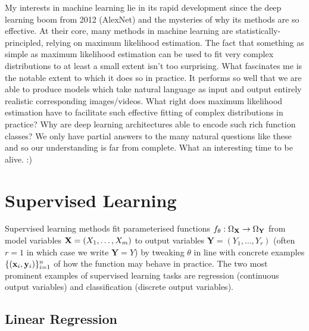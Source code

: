 \documentclass[11pt]{article}
\begin{document}
My interests in machine learning lie in its rapid development since the deep learning boom from 2012 (AlexNet) and the mysteries of why its methods are so effective. At their core, many methods in machine learning are statistically-principled, relying on maximum likelihood estimation. The fact that something as simple as maximum likelihood estimation can be used to fit very complex distributions to at least a small extent isn't too surprising. What fascinates me is the notable extent to which it does so in practice. It performs so well that we are able to produce models which take natural language as input and output entirely realistic corresponding images/videos. What right does maximum likelihood estimation have to facilitate such effective fitting of complex distributions in practice? Why are deep learning architectures able to encode such rich function classes? We only have partial answers to the many natural questions like these and so our understanding is far from complete. What an interesting time to be alive. :)

\section{Supervised Learning}
Supervised learning methods fit parameterised functions $f_{\theta}:\Omega_{\mathbf{X}}\to\Omega_{\mathbf{Y}}$ from model variables $\mathbf{X}=(X_1,\dots,X_m)$ to output variables $\mathbf{Y}=(Y_1,\dots,Y_r)$ (often $r=1$ in which case we write $\mathbf{Y}=Y$) by tweaking $\theta$ in line with concrete examples $\{(\mathbf{x}_i,\mathbf{y}_i)\}_{i=1}^n$ of how the function may behave in practice. The two most prominent examples of supervised learning tasks are regression (continuous output variables) and classification (discrete output variables).

\subsection{Linear Regression}
\end{document}
